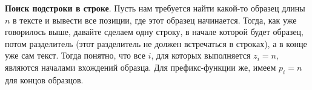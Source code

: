 \textbf{Поиск подстроки в строке}. Пусть нам требуется найти какой-то образец длины $n$ в тексте и вывести все позиции, где этот образец начинается. Тогда, как уже говорилось выше, давайте сделаем одну строку, в начале которой будет образец, потом разделитель (этот разделитель не должен встречаться в строках), а в конце уже сам текст. Тогда понятно, что все $i$, для которых выполняется $z_i = n$, являются началами вхождений образца. Для префикс-функции же, имеем $p_i = n$ для концов образцов.
